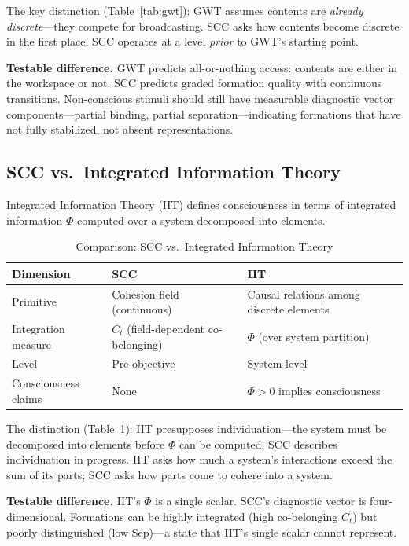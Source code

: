 \documentclass[lettersize,journal]{IEEEtran}
\begin{document}
The key distinction (Table~\ref{tab:gwt}): GWT assumes contents are \emph{already discrete}---they compete for broadcasting. SCC asks how contents become discrete in the first place. SCC operates at a level \emph{prior} to GWT's starting point.

\textbf{Testable difference.} GWT predicts all-or-nothing access: contents are either in the workspace or not. SCC predicts graded formation quality with continuous transitions. Non-conscious stimuli should still have measurable diagnostic vector components---partial binding, partial separation---indicating formations that have not fully stabilized, not absent representations.

\subsection{SCC vs.\ Integrated Information Theory}

Integrated Information Theory (IIT) \cite{tononi2004information,oizumi2014phenomenology} defines consciousness in terms of integrated information $\Phi$ computed over a system decomposed into elements.

\begin{table}[!t]
\centering
\caption{Comparison: SCC vs.\ Integrated Information Theory}
\label{tab:iit}
\begin{tabular}{p{2.2cm}p{2.8cm}p{2.5cm}}
\toprule
\textbf{Dimension} & \textbf{SCC} & \textbf{IIT} \\
\midrule
Primitive & Cohesion field (continuous) & Causal relations among discrete elements \\
\addlinespace
Integration measure & $C_t$ (field-dependent co-belonging) & $\Phi$ (over system partition) \\
\addlinespace
Level & Pre-objective & System-level \\
\addlinespace
Consciousness claims & None & $\Phi > 0$ implies consciousness \\
\bottomrule
\end{tabular}
\end{table}

The distinction (Table~\ref{tab:iit}): IIT presupposes individuation---the system must be decomposed into elements before $\Phi$ can be computed. SCC describes individuation in progress. IIT asks how much a system's interactions exceed the sum of its parts; SCC asks how parts come to cohere into a system.

\textbf{Testable difference.} IIT's $\Phi$ is a single scalar. SCC's diagnostic vector is four-dimensional. Formations can be highly integrated (high co-belonging $C_t$) but poorly distinguished (low Sep)---a state that IIT's single scalar cannot represent.
\end{document}
